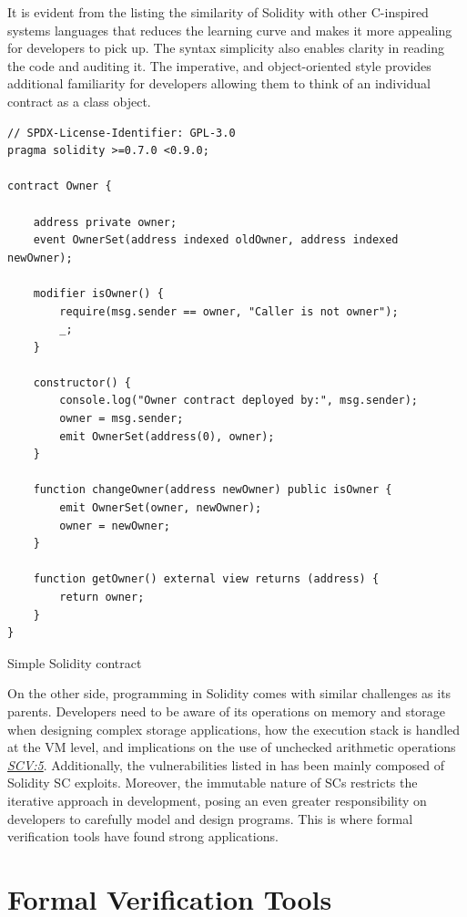 \documentclass[oneside]{ecsproject}     %
\newcommand{\vref}[1]{\textit{\hyperref[#1]{#1}}}
\begin{document}
It is evident from the listing the similarity of Solidity with other C-inspired systems languages that reduces
the learning curve and makes it more appealing for developers to pick up.
The syntax simplicity also enables clarity in reading the code and auditing it. The imperative, and object-oriented style
provides additional familiarity for developers allowing them to think of an individual contract as a class object.

\begin{listing}
\begin{verbatim}
// SPDX-License-Identifier: GPL-3.0
pragma solidity >=0.7.0 <0.9.0;

contract Owner {

    address private owner;
    event OwnerSet(address indexed oldOwner, address indexed newOwner);

    modifier isOwner() {
        require(msg.sender == owner, "Caller is not owner");
        _;
    }

    constructor() {
        console.log("Owner contract deployed by:", msg.sender);
        owner = msg.sender;
        emit OwnerSet(address(0), owner);
    }

    function changeOwner(address newOwner) public isOwner {
        emit OwnerSet(owner, newOwner);
        owner = newOwner;
    }

    function getOwner() external view returns (address) {
        return owner;
    }
}
\end{verbatim}
\caption{Simple Solidity contract}
\label{Listing:solidity}
\end{listing}

On the other side, programming in Solidity comes with similar challenges as its parents. 
Developers need to be aware of its operations on memory and storage when designing complex storage applications, 
how the execution stack is handled at the VM level, 
and implications on the use of unchecked arithmetic operations \vref{SCV:5}.
Additionally, the vulnerabilities listed in  
has been mainly composed of Solidity SC exploits.
Moreover, the immutable nature of SCs restricts the iterative approach in development,
posing an even greater responsibility on developers to carefully model and design programs.
This is where formal verification tools have found strong applications.

\section{Formal Verification Tools} \label{Chapter:FVT}
\end{document}
